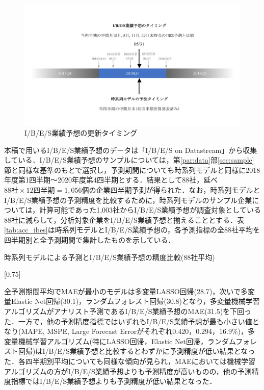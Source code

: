 \documentclass[a4paper，12pt]{jsarticle}
\begin{document}
\begin{figure}[htbp]
  \centering
  \includegraphics[width=12cm]{./img/_ibes_timing.pdf}
  \caption{I/B/E/S業績予想の更新タイミング}
  \label{fig:ibes_timing}
\end{figure}

本稿で用いるI/B/E/S業績予想のデータは「I/B/E/S on Datastream」から収集している．I/B/E/S業績予想のサンプルについては，第\ref{par:data}部\ref{sec:sample}節と同様な基準のもとで選択し，予測期間についても時系列モデルと同様に2018年度第1四半期～2020年度第4四半期とする．結果として88社，延べ $88社 \times 12四半期 = 1,056個$の企業四半期予測が得られた．なお，時系列モデルとI/B/E/S業績予想の予測精度を比較するために，時系列モデルのサンプル企業については，計算可能であった1,003社からI/B/E/S業績予想が調査対象としている88社に減らして，分析対象企業をI/B/E/S業績予想と揃えることとする．表\ref{tab:acc_ibes}は時系列モデルとI/B/E/S業績予想の，各予測指標の全88社平均を四半期別と全予測期間で集計したものを示している．

\begin{landscape}
\begin{table}
    \caption{時系列モデルによる予測とI/B/E/S業績予想の精度比較(88社平均)}
    \label{tab:acc_ibes}
    \scalebox{0.75}[0.75]{
      
    }
\end{table}
\end{landscape}

全予測期間平均でMAEが最小のモデルは多変量LASSO回帰(28.7)，次いで多変量Elastic Net回帰(30.1)，ランダムフォレスト回帰(30.8)となり，多変量機械学習アルゴリズムがアナリスト予測であるI/B/E/S業績予想のMAE(31.5)を下回った．一方で，他の予測精度指標ではいずれもI/B/E/S業績予想が最も小さい値となり(MAPE, MSPE, Large Forecast Errorがそれぞれ0.420，0.294，16.9\%)，多変量機械学習アルゴリズム(特にLASSO回帰，Elastic Net回帰，ランダムフォレスト回帰)はI/B/E/S業績予想と比較するとわずかに予測精度が低い結果となった．各四半期別平均についても同様な傾向が見られ，MAEにおいては機械学習アルゴリズムの方がI/B/E/S業績予想よりも予測精度が高いものの，他の予測精度指標ではI/B/E/S業績予想よりも予測精度が低い結果となった．
\end{document}
